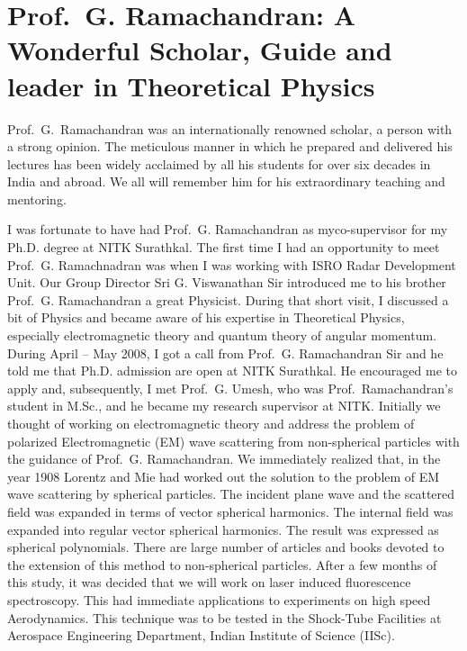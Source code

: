 \chapter[A Wonderful Scholar, Guide and leader in Theoretical\hfil\break Physics]{Prof.\ G. Ramachandran: A Wonderful Scholar, Guide and leader in Theoretical Physics}\label{chap35}


Prof.\ G.\ Ramachandran was an internationally renowned scholar, a person with a strong opinion. The meticulous manner in which he prepared and delivered his lectures has been widely acclaimed by all his students for over six decades in India and abroad. We all will remember him for his extraordinary teaching and mentoring.

I was fortunate to have had Prof.\ G. Ramachandran as my\break co-supervisor for my Ph.D. degree at NITK Surathkal. The first time I had an opportunity to meet Prof.\ G. Ramachnadran was when I was working with ISRO Radar Development Unit. Our Group Director Sri G. Viswanathan Sir introduced me to his brother Prof.\ G. Ramachandran a great Physicist. During that short visit, I discussed a bit of Physics and became aware of his expertise in Theoretical Physics, especially electromagnetic theory and quantum theory of angular momentum. During April -- May 2008, I got a call from Prof.\ G. Ramachandran Sir and he told me that Ph.D. admission are open at NITK Surathkal. He encouraged me to apply and, subsequently, I met Prof.\ G. Umesh, who was Prof.\ Ramachandran's student in M.Sc., and he became my research supervisor at NITK. Initially we thought of working on electromagnetic theory and address the problem of polarized Electromagnetic (EM) wave scattering from non-spherical particles with the guidance of Prof.\ G. Ramachandran. We immediately realized that, in the year 1908 Lorentz and Mie had worked out the solution to the problem of EM wave scattering by spherical particles. The incident plane wave and the scattered field was expanded in terms of vector spherical harmonics. The internal field was expanded into regular vector spherical harmonics. The result was expressed as spherical polynomials. There are large number of articles and books devoted to the extension of this method to non-spherical particles. After a few months of this study, it was decided that we will work on  laser induced fluorescence spectroscopy. This had immediate applications to experiments on high speed Aerodynamics. This technique was to be tested in the Shock-Tube Facilities at Aerospace Engineering Department, Indian Institute of Science (IISc).

